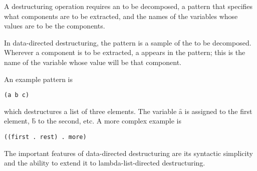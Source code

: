  
A destructuring operation requires an  to be decomposed, 
a pattern that specifies what components are to be extracted, and the names
of the variables whose values are to be the components.
 

In data-directed destructuring,
the pattern is a sample  of the  to be decomposed.
Wherever a component is to be extracted, 
a  appears in the pattern; 
this  is the name of the variable whose value will be that component.
 

An example pattern is
 
{\tt 	(a b c)}
 
which destructures a list of three elements.  The variable \f{a} is assigned
to the first element, \f{b} to the second, etc.  A more complex example
is

{\tt 	((first . rest) . more)}
 
The important features of data-directed destructuring are its syntactic
simplicity and the ability to extend it to lambda-list-directed destructuring.

\endsubsubsubsubsection%

\endsubsubsubsection%

